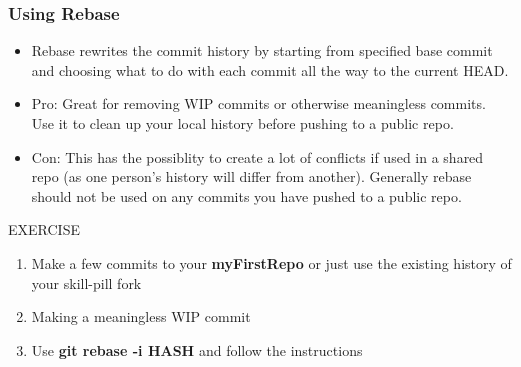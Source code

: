 \documentclass{beamer}
\begin{document}
\begin{frame}[fragile]
\frametitle{Using Rebase}
\begin{itemize}
\item Rebase rewrites the commit history by starting from specified base commit and choosing what to do with each commit all the way to the current HEAD.
\item Pro: Great for removing WIP commits or otherwise meaningless commits. Use it to clean up your local history before pushing to a public repo.
\item Con: This has the possiblity to create a lot of conflicts if used in a shared repo (as one person's history will differ from another). Generally rebase should not be used on any commits you have pushed to a public repo. 
\end{itemize}
    \begin{block}{EXERCISE}
        \begin{enumerate}
        \item Make a few commits to your \textbf{myFirstRepo} or just use the existing history of your skill-pill fork
	 \item Making a meaningless WIP commit
	 \item Use \textbf{git rebase -i \textlangle{}HASH\textrangle{}} and follow the instructions
        \end{enumerate}
    \end{block}
\end{frame}
\end{document}
